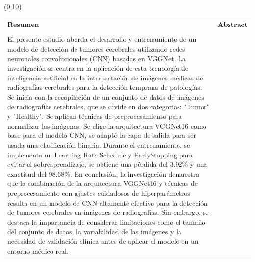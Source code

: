 \documentclass[12pt,twoside,titlepage]{ingenius}
\begin{document}
\renewcommand{\lstlistingname}{Algorithm}
\setcounter{page}{1}
\renewcommand{\refname}{Referencia}
\renewcommand{\figurename}{Figura}
\renewcommand{\tablename}{Tabla}
\frenchspacing






\membrete




\begin{textblock}{12.35}(0,10)%
\adscripcion
\end{textblock}

\begin{table}[htb]
\begin{tabular}{p{8cm}p{8cm}}
{\Large \bfseries Resumen} &{\Large \bfseries Abstract} \\ \\
El presente estudio aborda el desarrollo y entrenamiento de un modelo de detección de tumores cerebrales utilizando redes neuronales convolucionales (CNN) basadas en VGGNet. La investigación se centra en la aplicación de esta tecnología de inteligencia artificial en la interpretación de imágenes médicas de radiografías cerebrales para la detección temprana de patologías.
Se inicia con la recopilación de un conjunto de datos de imágenes de radiografías cerebrales, que se divide en dos categorías: "Tumor" y "Healthy". Se aplican técnicas de preprocesamiento para normalizar las imágenes.
Se elige la arquitectura VGGNet16 como base para el modelo CNN, se adaptó la capa de salida para ser usada una clasificación binaria. Durante el entrenamiento, se implementa un Learning Rate Schedule y EarlyStopping para evitar el sobreaprendizaje, se obtiene una pérdida del 3.92\% y una exactitud del 98.68\%. 
En conclusión, la investigación demuestra que la combinación de la arquitectura VGGNet16 y técnicas de preprocesamiento con ajustes cuidadosos de hiperparámetros resulta en un modelo de CNN altamente efectivo para la detección de tumores cerebrales en imágenes de radiografías. Sin embargo, se destaca la importancia de considerar limitaciones como el tamaño del conjunto de datos, la variabilidad de las imágenes y la necesidad de validación clínica antes de aplicar el modelo en un entorno médico real.



\end{tabular}
\end{table}
\end{document}
